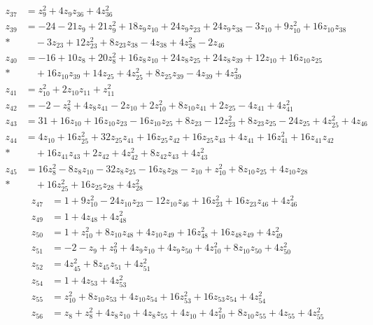 \documentclass[11pt]{article}
\theoremstyle{remark}
\begin{document}
\begin{align*}
z_{37}&=z_{9}^{2}+4z_{9} z_{36}+4z_{36}^{2}\\[3pt]
z_{39}&=-24-21z_{9}+21z_{9}^{2}+18z_{9} z_{10}+24z_{9} z_{23}+24z_{9} z_{38}-3z_{10}+9z_{10}^{2}+16z_{10} z_{38}\\*
&\quad{}-3z_{23}+12z_{23}^{2}+8z_{23} z_{38}-4z_{38}+4z_{38}^{2}-2z_{46}\\[3pt]
z_{40}&=-16+10z_{8}+20z_{8}^{2}+16z_{8} z_{10}+24z_{8} z_{25}+24z_{8} z_{39}+12z_{10}+16z_{10} z_{25}\\*
&\quad{}+16z_{10} z_{39}+14z_{25}+4z_{25}^{2}+8z_{25} z_{39}-4z_{39}+4z_{39}^{2}\\[3pt]
z_{41}&=z_{10}^{2}+2z_{10} z_{11}+z_{11}^{2}\\[3pt]
z_{42}&=-2-z_{8}^{2}+4z_{8} z_{41}-2z_{10}+2z_{10}^{2}+8z_{10} z_{41}+2z_{25}-4z_{41}+4z_{41}^{2}\\[3pt]
z_{43}&=31+16z_{10}+16z_{10} z_{23}-16z_{10} z_{25}+8z_{23}-12z_{23}^{2}+8z_{23} z_{25}-24z_{25}+4z_{25}^{2}+4z_{46}\\[3pt]
z_{44}&=4z_{10}+16z_{25}^{2}+32z_{25} z_{41}+16z_{25} z_{42}+16z_{25} z_{43}+4z_{41}+16z_{41}^{2}+16z_{41} z_{42}\\*
&\quad{}+16z_{41} z_{43}+2z_{42}+4z_{42}^{2}+8z_{42} z_{43}+4z_{43}^{2}\\[3pt]
z_{45}&=16z_{8}^{2}-8z_{8} z_{10}-32z_{8} z_{25}-16z_{8} z_{28}-z_{10}+z_{10}^{2}+8z_{10} z_{25}+4z_{10} z_{28}\\*
&\quad{}+16z_{25}^{2}+16z_{25} z_{28}+4z_{28}^{2}
\end{align*}
\begin{align*}
z_{47}&=1+9z_{10}^{2}-24z_{10} z_{23}-12z_{10} z_{46}+16z_{23}^{2}+16z_{23} z_{46}+4z_{46}^{2}\\[3pt]
z_{49}&=1+4z_{48}+4z_{48}^{2}\\[3pt]
z_{50}&=1+z_{10}^{2}+8z_{10} z_{48}+4z_{10} z_{49}+16z_{48}^{2}+16z_{48} z_{49}+4z_{49}^{2}\\[3pt]
z_{51}&=-2-z_{9}+z_{9}^{2}+4z_{9} z_{10}+4z_{9} z_{50}+4z_{10}^{2}+8z_{10} z_{50}+4z_{50}^{2}\\[3pt]
z_{52}&=4z_{45}^{2}+8z_{45} z_{51}+4z_{51}^{2}\\[3pt]
z_{54}&=1+4z_{53}+4z_{53}^{2}\\[3pt]
z_{55}&=z_{10}^{2}+8z_{10} z_{53}+4z_{10} z_{54}+16z_{53}^{2}+16z_{53} z_{54}+4z_{54}^{2}\\[3pt]
z_{56}&=z_{8}+z_{8}^{2}+4z_{8} z_{10}+4z_{8} z_{55}+4z_{10}+4z_{10}^{2}+8z_{10} z_{55}+4z_{55}+4z_{55}^{2}
\end{align*}
\end{document}
